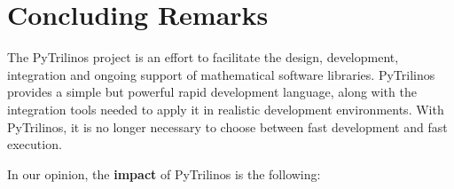 \documentclass[10pt,relax]{SANDreport}
\begin{document}
\section{Concluding Remarks}
\label{sec:concluding}

The PyTrilinos project is an effort to facilitate the design, development,
integration and ongoing support of mathematical software libraries. 
PyTrilinos provides a simple but powerful rapid development language, along with
the integration tools needed to apply it in realistic development
environments. With PyTrilinos, it is no longer necessary to choose between fast
development and fast execution.

In our opinion, the {\bf impact} of PyTrilinos is the following:
\end{document}
